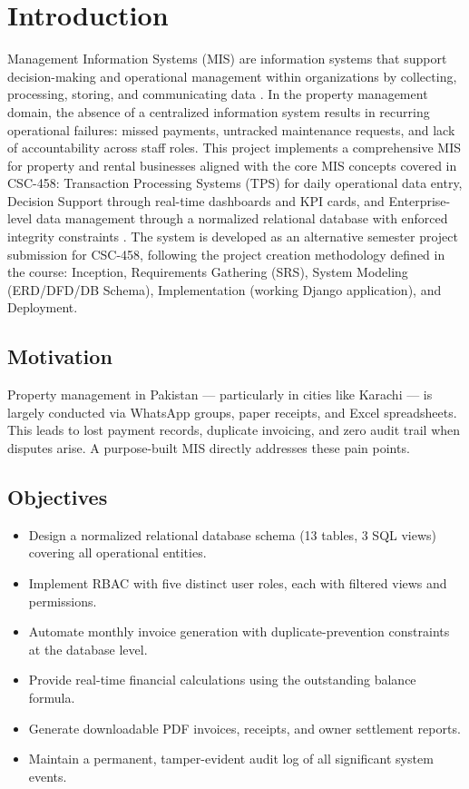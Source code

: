 \documentclass[conference]{IEEEtran}
\begin{document}
\section{Introduction}

Management Information Systems (MIS) are information systems that support decision-making and operational management within organizations by collecting, processing, storing, and communicating data \cite{laudon2013}. In the property management domain, the absence of a centralized information system results in recurring operational failures: missed payments, untracked maintenance requests, and lack of accountability across staff roles. This project implements a comprehensive MIS for property and rental businesses aligned with the core MIS concepts covered in CSC-458: Transaction Processing Systems (TPS) for daily operational data entry, Decision Support through real-time dashboards and KPI cards, and Enterprise-level data management through a normalized relational database with enforced integrity constraints \cite{laudon2014}. The system is developed as an alternative semester project submission for CSC-458, following the project creation methodology defined in the course: Inception, Requirements Gathering (SRS), System Modeling (ERD/DFD/DB Schema), Implementation (working Django application), and Deployment.

\subsection{Motivation}

Property management in Pakistan — particularly in cities like Karachi — is largely conducted via WhatsApp groups, paper receipts, and Excel spreadsheets. This leads to lost payment records, duplicate invoicing, and zero audit trail when disputes arise. A purpose-built MIS directly addresses these pain points.

\subsection{Objectives}

\begin{itemize}
    \item Design a normalized relational database schema (13 tables, 3 SQL views) covering all operational entities.
    \item Implement RBAC with five distinct user roles, each with filtered views and permissions.
    \item Automate monthly invoice generation with duplicate-prevention constraints at the database level.
    \item Provide real-time financial calculations using the outstanding balance formula.
    \item Generate downloadable PDF invoices, receipts, and owner settlement reports.
    \item Maintain a permanent, tamper-evident audit log of all significant system events.
\end{itemize}
\end{document}
